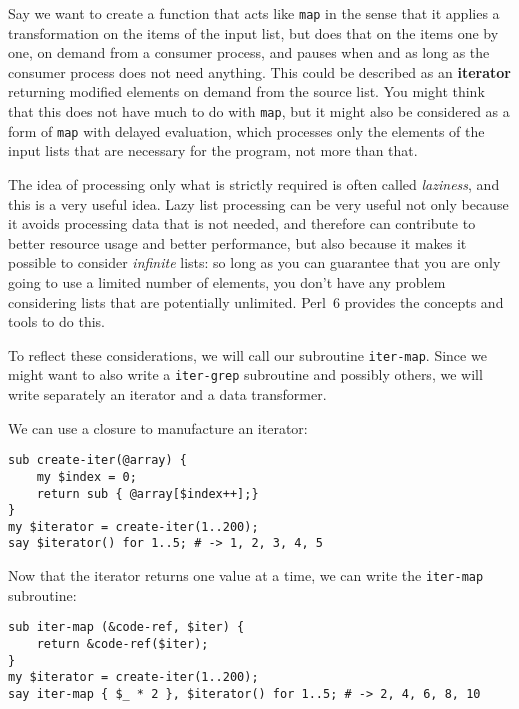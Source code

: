Say we want to create a function that acts like 
{\tt map} in the sense that it applies a 
transformation on the items of the input list, but does 
that on the items one by one, on demand from a consumer 
process, and pauses when and as long as the consumer process 
does not need anything. This could be described as an 
{\bf iterator} returning modified elements on demand from the 
source list. You might think that this does not have much to 
do with {\tt map}, but it might also be considered as 
a form of {\tt map} with delayed evaluation, which 
processes only the elements of the input lists that are 
necessary for the program, not more than that. 

The idea 
of processing only what is strictly required is often called 
\emph{laziness}, and this is a very useful idea. Lazy 
list processing can be very useful not only because it 
avoids processing data that is not needed, and therefore 
can contribute to better resource usage and better 
performance, but also because it makes it possible to consider 
\emph{infinite} lists: so long as you can guarantee that 
you are only going to use a limited number of elements, 
you don't have any problem considering lists that are 
potentially unlimited. Perl~6 provides the concepts and 
tools to do this.

To reflect these considerations, we will call our subroutine 
{\tt iter-map}. Since we might want to also write a 
{\tt iter-grep} subroutine and possibly others, we will 
write separately an iterator and a data transformer.

We can use a closure to manufacture an iterator:

\begin{verbatim}
sub create-iter(@array) {
    my $index = 0;
    return sub { @array[$index++];}
}
my $iterator = create-iter(1..200);
say $iterator() for 1..5; # -> 1, 2, 3, 4, 5
\end{verbatim} 

Now that the iterator returns one value at a time, we 
can write the {\tt iter-map} subroutine:

\begin{verbatim}
sub iter-map (&code-ref, $iter) {
    return &code-ref($iter);
}
my $iterator = create-iter(1..200);
say iter-map { $_ * 2 }, $iterator() for 1..5; # -> 2, 4, 6, 8, 10
\end{verbatim}

